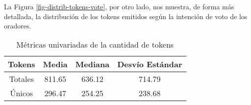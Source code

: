 La Figura \ref{fig-distrib-tokens-vote}, por otro lado, nos muestra,
de forma más detallada, la distribución de los tokens emitidos según
la intención de voto de los oradores.

\begin{table}[h!]
\begin{center}
\begin{tabular}{ |c|c|c|c| }
\hline
Tokens & Media & Mediana & Desvío Estándar \\
\hline\hline
Totales & 811.65 & 636.12 & 714.79 \\
\hline
Únicos & 296.47 & 254.25 & 238.68 \\
\hline
\end{tabular}
\caption{M\'etricas univariadas de la cantidad de tokens}
\label{table-tokens}
\end{center}
\end{table}
